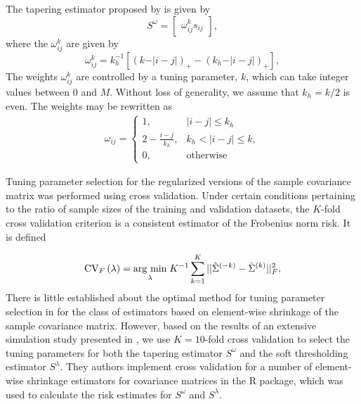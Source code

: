 The tapering estimator proposed by \cite{cai2010optimal} is given by
\[
S^{\omega} =  \begin{bmatrix} \omega_{ij}^k s_{ij} \end{bmatrix},
\]
\noindent
where the $\omega_{ij}^k$ are given by 
\begin{equation*}
\omega^k_{ij} = k_h^{-1} \left[ \left( k - \vert i-j\vert\right)_+ - \left(k_h - \vert i-j\vert\right)_+ \right],
\end{equation*}
\noindent
The weights $\omega^k_{ij}$ are controlled by a tuning parameter, $k$,  which can take integer values between 0 and $M$. Without loss of generality,  we assume that $k_h = k/2$ is even. The weights may be rewritten as
\begin{align*}
\omega_{ij} = \left\{\begin{array}{ll} 1, & \vert i -j \vert \le k_h \\
                             2 - \frac{i - j}{k_h}, & k_h < \vert  i -j \vert \le k, \\
                             0, & \mbox{otherwise}  \end{array} \right.
\end{align*}
\noindent

\bigskip

Tuning parameter selection for the regularized versions of the sample covariance matrix was performed using cross validation. Under certain conditions pertaining to the ratio of sample sizes of the training and validation datasets, the $K$-fold cross validation criterion is a consistent estimator of the Frobenius norm risk. It is defined 

\begin{equation} \label{eq:K-fold-matrix--cv}
\mbox{CV}_F\left(\lambda \right) = \underset{\lambda}{\operatorname{arg}\,\operatorname{min}}\; K^{-1} \sum_{k = 1}^K  \vert \vert\hat{\Sigma}^{\left(-k\right)} - \tilde{\Sigma}^{\left(k\right)}  \vert \vert_F^2, 
\end{equation}
\noindent
There is little established about the optimal method for tuning parameter selection in for the class of estimators based on element-wise shrinkage of the sample covariance matrix.  However, based on the results of an extensive simulation study presented in \cite{fang2016tuning}, we use $K = 10$-fold cross validation to select the tuning parameters for both the tapering estimator $S^\omega$ and the soft thresholding estimator $S^{\lambda}$. They authors implement cross validation for a number of element-wise shrinkage estimators for covariance matrices in the \cite{CVTuningCov} R package, which was used to calculate the risk estimates for $S^{\omega}$ and $S^{\lambda}$. 

